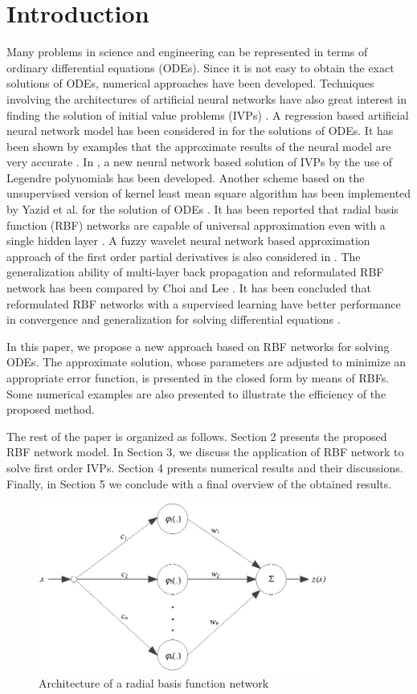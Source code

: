 \section{Introduction}
\label{intro}
Many problems in science and engineering can be represented in terms of ordinary differential equations (ODEs). Since it is not easy to obtain the exact solutions of ODEs, numerical approaches have been developed. Techniques involving the architectures of artificial neural networks have also great interest in finding the solution of initial value problems (IVPs) \cite{Mal1}\cite{Mal2}\cite{Shir3}\cite{Park4}. A regression based artificial neural network model has been considered in \cite{Mal1} for the solutions of ODEs. It has been shown by examples that the approximate results of the neural model are very accurate \cite{Mal1}. In \cite{Mal2}, a new neural network based solution of IVPs by the use of Legendre polynomials has been developed. Another scheme based on the unsupervised version of kernel least mean square algorithm has been implemented by Yazid et al. for the solution of ODEs \cite{Shir3}. It has been reported that radial basis function (RBF) networks are capable of universal approximation even with a single hidden layer \cite{Park4}. A fuzzy wavelet neural network based approximation approach of the first order partial derivatives is also considered in \cite{Nejad6}. The generalization ability of multi-layer back propagation and reformulated RBF network has been compared by Choi and Lee \cite{Choi5}. It has been concluded that reformulated RBF networks with a supervised learning have better performance in convergence and generalization for solving differential equations \cite{Choi5}.

In this paper, we propose a new approach based on RBF networks for solving ODEs. The approximate solution, whose parameters are adjusted to minimize an appropriate error function, is presented in the closed form by means of RBFs. Some numerical examples are also presented to illustrate the efficiency of the proposed method.

The rest of the paper is organized as follows. Section 2 presents the proposed RBF network model. In Section 3, we discuss the application of RBF network to solve first order IVPs. Section 4 presents numerical results and their discussions. Finally, in Section 5 we conclude with a final overview of the obtained results.

\begin{figure}
\includegraphics[width=9.5cm]{Fig1.eps}
\caption{Architecture of a radial basis function network}
\label{fig1}      
\end{figure}

